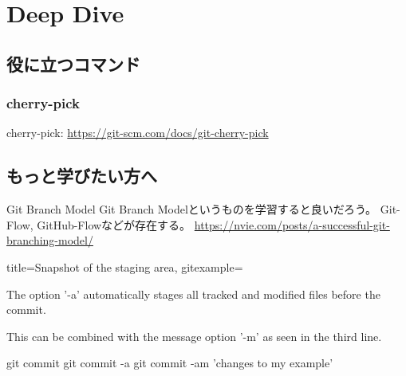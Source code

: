 \documentclass[10pt,a4j,openany,dvipdfmx]{jsarticle}
\begin{document}
\section{Deep Dive} %
\label{sec:Deep Dive}


\subsection{役に立つコマンド} %
\label{sub:役に立つコマンド}


\subsubsection{cherry-pick} %
\label{ssub:cherry_pick}

cherry-pick: \url{https://git-scm.com/docs/git-cherry-pick}



\subsection{もっと学びたい方へ} %
\label{sub:もっと学びたい方へ}


\begin{skybox}{Git Branch Model}
Git Branch Modelというものを学習すると良いだろう。
Git-Flow, GitHub-Flowなどが存在する。
\tcblower
\url{https://nvie.com/posts/a-successful-git-branching-model/}
\end{skybox}




\begin{tcblisting}{title={Snapshot of the staging area},
gitexample={The option '-a' automatically stages all tracked and modified
files before the commit.\par
This can be combined with the message option '-m'
as seen in the third line.}}
git commit
git commit -a
git commit -am 'changes to my example'
\end{tcblisting}
\end{document}
